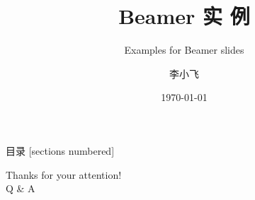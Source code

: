 \documentclass[12pt,UTF8,aspectratio=169]{beamer}
\begin{document}

\author{\myfont 李小飞}
\title{\textbf{\Huge Beamer 实 例}}
\subtitle{Examples for Beamer slides}
\date{\today}

\maketitle
    \begin{frame}{目录}
        [sections numbered]
        \tableofcontents[hideallsubsections]
    \end{frame}%




\begin{frame}
	\begin{center}
		\huge Thanks for your attention! \\ Q \& A
	\end{center}
\end{frame}

\end{document}
